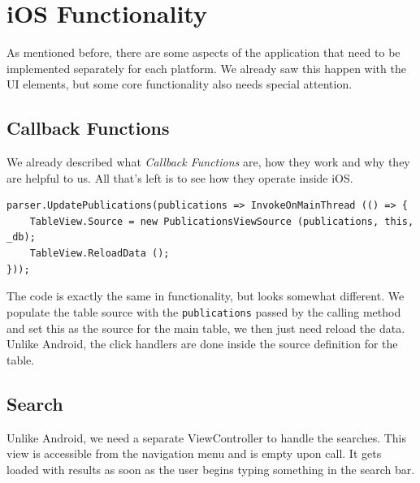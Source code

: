 \section{iOS Functionality}

As mentioned before, there are some aspects of the application that need to be implemented separately for each platform. We already saw this happen with the \ac{UI} elements, but some core functionality also needs special attention.

\subsection{Callback Functions}\label{callback:ios}

We already described what \textit{Callback Functions} are, how they work and why they are helpful to us. All that's left is to see how they operate inside iOS.

\begin{lstlisting}[frame=lt,caption=Callback iOS, label={list:call_ios}]
parser.UpdatePublications(publications => InvokeOnMainThread (() => {
	TableView.Source = new PublicationsViewSource (publications, this, _db);
	TableView.ReloadData ();
}));
\end{lstlisting}

The code is exactly the same in functionality, but looks somewhat different. We populate the table source with the \texttt{publications} passed by the calling method and set this as the source for the main table, we then just need reload the data. Unlike Android, the click handlers are done inside the source definition for the table. 


\subsection{Search}

Unlike Android, we need a separate ViewController to handle the searches. This view is accessible from the navigation menu and is empty upon call. It gets loaded with results as soon as the user begins typing something in the search bar.

